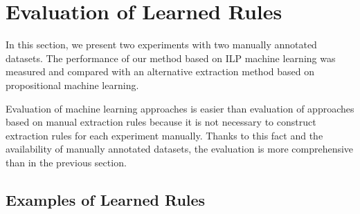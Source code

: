 
\section{Evaluation of Learned Rules} \label{sec:learning_eval}

In this section, we present two experiments with two manually annotated datasets. The performance of our method based on ILP machine learning was measured and compared with an alternative extraction method based on propositional machine learning.

Evaluation of machine learning approaches is easier than evaluation of approaches based on manual extraction rules because it is not necessary to construct extraction rules for each experiment manually. Thanks to this fact and the availability of manually annotated datasets, the evaluation is more comprehensive than in the previous section.

\subsection{Examples of Learned Rules}


